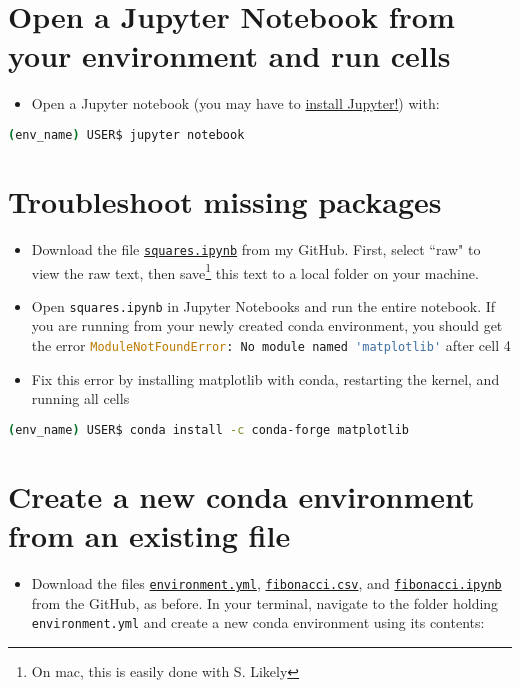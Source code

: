 \documentclass[10pt]{article}
\begin{document}
	
\section{Open a Jupyter Notebook from your environment and run cells}
\begin{itemize}
	\item Open a Jupyter notebook (you may have to \href{https://anaconda.org/anaconda/jupyter}{install Jupyter!}) with:
\end{itemize}

\begin{lstlisting}[language=bash]
	(env_name) USER$ jupyter notebook
\end{lstlisting}

\section{Troubleshoot missing packages}
\begin{itemize}
	\item Download the file \href{https://github.com/m-needham/first_year_programming_sequence/blob/main/1_conda_jupyter/squares.ipynb}{ \lstinline|squares.ipynb|} from my GitHub. First, select ``raw" to view the raw text, then save\footnote{On mac, this is easily done with \cmd S. Likely } this text to a local folder on your machine.
	
	\item Open \lstinline|squares.ipynb| in Jupyter Notebooks and run the entire notebook. If you are running from your newly created conda environment, you should get the error  \lstinline[language=Python]|ModuleNotFoundError: No module named 'matplotlib'|  after cell 4
	
	\item Fix this error by installing matplotlib with conda, restarting the kernel, and running all cells 
	
\end{itemize}

\begin{lstlisting}[language=bash]
	(env_name) USER$ conda install -c conda-forge matplotlib
\end{lstlisting}

\section{Create a new conda environment from an existing file}

\begin{itemize}
	\item Download the files \href{https://github.com/m-needham/first_year_programming_sequence/blob/main/1_conda_jupyter/environment.yml}{\lstinline|environment.yml|}, \href{https://github.com/m-needham/first_year_programming_sequence/blob/main/1_conda_jupyter/fibonacci.csv}{\lstinline|fibonacci.csv|}, and \href{https://github.com/m-needham/first_year_programming_sequence/blob/main/1_conda_jupyter/fibonacci.ipynb}{\lstinline|fibonacci.ipynb|} from the GitHub, as before. In your terminal, navigate to the folder holding \lstinline|environment.yml| and create a new conda environment using its contents: 
\end{itemize}
\end{document}
